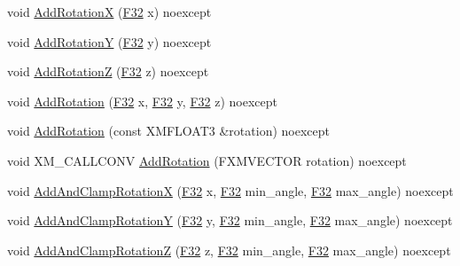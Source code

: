 \begin{DoxyCompactItemize}
\item 
void \hyperlink{classmage_1_1_transform_a920bcbc350d3896bd1d8f9f6233cc008}{Add\+RotationX} (\hyperlink{namespacemage_aa97e833b45f06d60a0a9c4fc22ae02c0}{F32} x) noexcept
\item 
void \hyperlink{classmage_1_1_transform_ab9e20e922cd6e651a984480aa0aa6752}{Add\+RotationY} (\hyperlink{namespacemage_aa97e833b45f06d60a0a9c4fc22ae02c0}{F32} y) noexcept
\item 
void \hyperlink{classmage_1_1_transform_a973e713992328de9f5ad3b6ed4779f40}{Add\+RotationZ} (\hyperlink{namespacemage_aa97e833b45f06d60a0a9c4fc22ae02c0}{F32} z) noexcept
\item 
void \hyperlink{classmage_1_1_transform_a3204b0669d2735a4c05af1f6e10b46b1}{Add\+Rotation} (\hyperlink{namespacemage_aa97e833b45f06d60a0a9c4fc22ae02c0}{F32} x, \hyperlink{namespacemage_aa97e833b45f06d60a0a9c4fc22ae02c0}{F32} y, \hyperlink{namespacemage_aa97e833b45f06d60a0a9c4fc22ae02c0}{F32} z) noexcept
\item 
void \hyperlink{classmage_1_1_transform_af59988a981b0914eb6b649f1f9602542}{Add\+Rotation} (const X\+M\+F\+L\+O\+A\+T3 \&rotation) noexcept
\item 
void X\+M\+\_\+\+C\+A\+L\+L\+C\+O\+NV \hyperlink{classmage_1_1_transform_ae131948e8d2c34d1207e2188f75a3e9f}{Add\+Rotation} (F\+X\+M\+V\+E\+C\+T\+OR rotation) noexcept
\item 
void \hyperlink{classmage_1_1_transform_a401e2b3b3fb0675cb439329ee931d9f0}{Add\+And\+Clamp\+RotationX} (\hyperlink{namespacemage_aa97e833b45f06d60a0a9c4fc22ae02c0}{F32} x, \hyperlink{namespacemage_aa97e833b45f06d60a0a9c4fc22ae02c0}{F32} min\+\_\+angle, \hyperlink{namespacemage_aa97e833b45f06d60a0a9c4fc22ae02c0}{F32} max\+\_\+angle) noexcept
\item 
void \hyperlink{classmage_1_1_transform_aff1d8909255e85eb0100e90b2ac5068a}{Add\+And\+Clamp\+RotationY} (\hyperlink{namespacemage_aa97e833b45f06d60a0a9c4fc22ae02c0}{F32} y, \hyperlink{namespacemage_aa97e833b45f06d60a0a9c4fc22ae02c0}{F32} min\+\_\+angle, \hyperlink{namespacemage_aa97e833b45f06d60a0a9c4fc22ae02c0}{F32} max\+\_\+angle) noexcept
\item 
void \hyperlink{classmage_1_1_transform_a6b8797abb38b3bbe894193c89bb63a71}{Add\+And\+Clamp\+RotationZ} (\hyperlink{namespacemage_aa97e833b45f06d60a0a9c4fc22ae02c0}{F32} z, \hyperlink{namespacemage_aa97e833b45f06d60a0a9c4fc22ae02c0}{F32} min\+\_\+angle, \hyperlink{namespacemage_aa97e833b45f06d60a0a9c4fc22ae02c0}{F32} max\+\_\+angle) noexcept
\item 

\end{DoxyCompactItemize}
